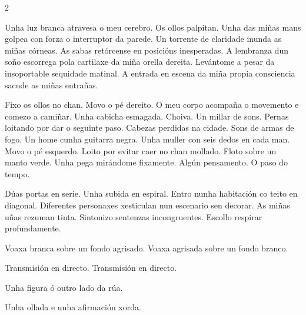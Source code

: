 
\begin{multicols}{2}

Unha luz branca atravesa o meu cerebro. Os ollos palpitan. Unha das miñas mans
golpea con forza o interruptor da parede. Un torrente de claridade inunda as
miñas córneas. As sabas retórcense en posicións inesperadas. A lembranza dun
soño escorrega pola cartilaxe da miña orella dereita. Levántome a pesar da
insoportable sequidade matinal. A entrada en escena da miña propia consciencia
sacude as miñas entrañas.

Fixo os ollos no chan. Movo o pé dereito. O meu corpo acompaña o movemento e
comezo a camiñar. Unha cabicha esmagada. Choiva. Un millar de sons. Pernas
loitando por dar o seguinte paso. Cabezas perdidas na cidade. Sons de armas de
fogo. Un home cunha guitarra negra. Unha muller con seis dedos en cada man.
Movo o pé esquerdo. Loito por evitar caer no chan mollado. Floto sobre un manto
verde. Unha pega mirándome fixamente. Algún pensamento. O paso do tempo.

Dúas portas en serie. Unha subida en espiral. Entro nunha habitación co teito
en diagonal. Diferentes personaxes xesticulan nun escenario sen decorar. As
miñas uñas rezuman tinta. Sintonizo sentenzas incongruentes. Escollo respirar
profundamente.

Voaxa branca sobre un fondo agrisado. Voaxa agrisada sobre un fondo branco.

Transmisión en directo. Transmisión en directo.

Unha figura ó outro lado da rúa.

Unha ollada e unha afirmación xorda.


\end{multicols}

\newpage
{}%

